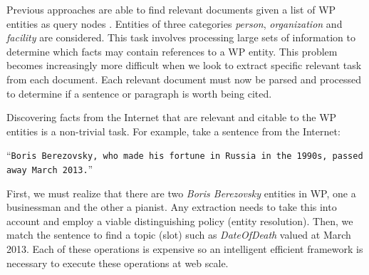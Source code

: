 Previous approaches are able to find relevant documents given a list of WP
entities as query nodes \cite{mcnamee2012hltcoe, dalton2013bi,
Bonnefoy:2013:WDE:2484028.2484180, Balog:2013:CCR:2484028.2484151,ji2011knowledge}.
Entities of three categories \textit{person}, \textit{organization} and \textit{facility} are considered.
This task involves processing large sets of information to determine which facts may contain references to a WP entity. 
This problem becomes increasingly more difficult when we look to extract specific relevant task from
each document.
Each relevant document must now be parsed and processed to determine if a sentence or paragraph is worth being cited.

Discovering facts from the Internet that are relevant and citable to the WP entities is a non-trivial task.
For example, take a sentence from the Internet:

``\texttt{Boris Berezovsky, who made his fortune in Russia in the 1990s, passed away March 2013.}''

First, we must realize that there are two \textit{Boris Berezovsky} entities in WP, one a businessman and the other a pianist.
Any extraction needs to take this into account and employ a viable distinguishing policy (entity resolution).
Then, we match the sentence to find a topic (slot) such as \textit{DateOfDeath} valued at March 2013.
Each of these operations is expensive so an intelligent efficient framework is necessary to execute these operations at web scale.



